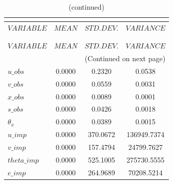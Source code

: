  
\begin{center}
\begin{longtable}{lccc} 
\caption{THEORETICAL MOMENTS}\\
 \label{Table:th_moments}\\
\toprule 
$VARIABLE    $	 & 	 $           MEAN$	 & 	 $      STD. DEV.$	 & 	 $       VARIANCE$\\
\midrule \endfirsthead 
\caption{(continued)}\\
 \toprule \\ 
$VARIABLE    $	 & 	 $           MEAN$	 & 	 $      STD. DEV.$	 & 	 $       VARIANCE$\\
\midrule \endhead 
\midrule \multicolumn{4}{r}{(Continued on next page)} \\ \bottomrule \endfoot 
\bottomrule \endlastfoot 
$u\_obs      $	 & 	         0.0000	 & 	         0.2320	 & 	         0.0538 \\ 
$v\_obs      $	 & 	         0.0000	 & 	         0.0559	 & 	         0.0031 \\ 
$x\_obs      $	 & 	         0.0000	 & 	         0.0089	 & 	         0.0001 \\ 
$s\_obs      $	 & 	         0.0000	 & 	         0.0426	 & 	         0.0018 \\ 
${\theta_x}  $	 & 	         0.0000	 & 	         0.0389	 & 	         0.0015 \\ 
$u\_imp      $	 & 	         0.0000	 & 	       370.0672	 & 	    136949.7374 \\ 
$v\_imp      $	 & 	         0.0000	 & 	       157.4794	 & 	     24799.7627 \\ 
$theta\_imp  $	 & 	         0.0000	 & 	       525.1005	 & 	    275730.5555 \\ 
$e\_imp      $	 & 	         0.0000	 & 	       264.9689	 & 	     70208.5214 \\ 
\end{longtable}
 \end{center}
